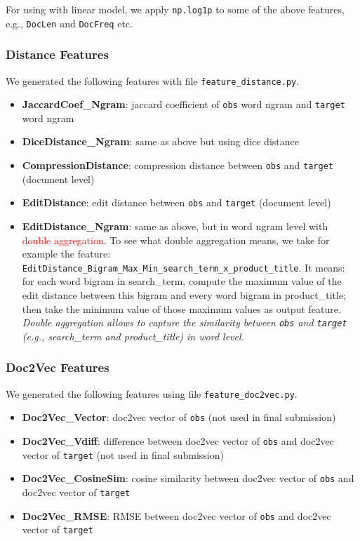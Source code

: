 \documentclass[12pt]{article}
\begin{document}
For using with linear model, we apply \texttt{np.log1p} to some of the above features, e.g., \texttt{DocLen} and \texttt{DocFreq} etc.

\subsubsection{Distance Features}
\label{subsec:Distance_Features}
We generated the following features with file \texttt{feature\_distance.py}.
\begin{itemize}
\item \textbf{JaccardCoef\_Ngram}: jaccard coefficient of \texttt{obs} word ngram and \texttt{target} word ngram
\item \textbf{DiceDistance\_Ngram}: same as above but using dice distance
\item \textbf{CompressionDistance}: compression distance between \texttt{obs} and \texttt{target} (document level)
\item \textbf{EditDistance}: edit distance between \texttt{obs} and \texttt{target} (document level)
\item \textbf{EditDistance\_Ngram}: same as above, but in word ngram level with \textcolor{red}{double aggregation}. To see what double aggregation means, we take for example the feature:  \texttt{EditDistance\_Bigram\_Max\_Min\_search\_term\_x\_product\_title}. It means: for each word bigram in search\_term, compute the maximum value of the edit distance between this bigram and every word bigram in product\_title; then take the minimum value of those maximum values as output feature. \emph{Double aggregation allows to capture the similarity between \texttt{obs} and \texttt{target} (e.g., search\_term and product\_title) in word level.}
\end{itemize}

\subsubsection{Doc2Vec Features}
We generated the following features using file \texttt{feature\_doc2vec.py}.
\begin{itemize}
\item \textbf{Doc2Vec\_Vector}: doc2vec vector of \texttt{obs} (not used in final submission)
\item \textbf{Doc2Vec\_Vdiff}: difference between doc2vec vector of \texttt{obs} and doc2vec vector of \texttt{target} (not used in final submission)
\item \textbf{Doc2Vec\_CosineSim}: cosine similarity between doc2vec vector of \texttt{obs} and doc2vec vector of \texttt{target}
\item \textbf{Doc2Vec\_RMSE}: RMSE between doc2vec vector of \texttt{obs} and doc2vec vector of \texttt{target}
\end{itemize}
\end{document}

